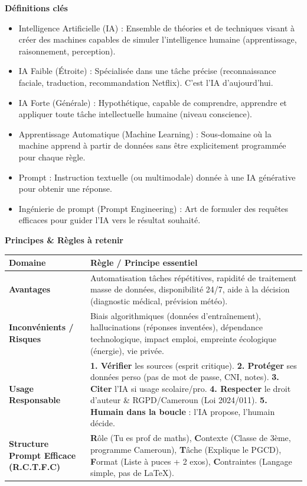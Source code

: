 \documentclass[11pt]{article}
\newcommand{\cle}[1]{{\popxbold\color{popdark}#1}}
\begin{document}
\begin{bilan}
\textbf{Définitions clés}
\begin{itemize}
  \item \cle{Intelligence Artificielle (IA)} : Ensemble de théories et de techniques visant à créer des machines capables de simuler l'intelligence humaine (apprentissage, raisonnement, perception).
  \item \cle{IA Faible (Étroite)} : Spécialisée dans une tâche précise (reconnaissance faciale, traduction, recommandation Netflix). C'est l'IA d'aujourd'hui.
  \item \cle{IA Forte (Générale)} : Hypothétique, capable de comprendre, apprendre et appliquer toute tâche intellectuelle humaine (niveau conscience).
  \item \cle{Apprentissage Automatique (Machine Learning)} : Sous-domaine où la machine apprend à partir de données sans être explicitement programmée pour chaque règle.
  \item \cle{Prompt} : Instruction textuelle (ou multimodale) donnée à une IA générative pour obtenir une réponse.
  \item \cle{Ingénierie de prompt (Prompt Engineering)} : Art de formuler des requêtes efficaces pour guider l'IA vers le résultat souhaité.
\end{itemize}

\textbf{Principes \& Règles à retenir}
\begin{center}
\begin{tabularx}{\linewidth}{|>{\bfseries}l|X|}
\hline
\rowcolor{popblueL}
\textcolor{popdark}{Domaine} & \textcolor{popdark}{Règle / Principe essentiel} \\
\hline
\textbf{Avantages} & Automatisation tâches répétitives, rapidité de traitement masse de données, disponibilité 24/7, aide à la décision (diagnostic médical, prévision météo). \\
\hline
\textbf{Inconvénients / Risques} & Biais algorithmiques (données d'entraînement), hallucinations (réponses inventées), dépendance technologique, impact emploi, empreinte écologique (énergie), vie privée. \\
\hline
\textbf{Usage Responsable} & \textbf{1. Vérifier} les sources (esprit critique). \textbf{2. Protéger} ses données perso (pas de mot de passe, CNI, notes). \textbf{3. Citer} l'IA si usage scolaire/pro. \textbf{4. Respecter} le droit d'auteur \& RGPD/Cameroun (Loi 2024/011). \textbf{5. Humain dans la boucle} : l'IA propose, l'humain décide. \\
\hline
\textbf{Structure Prompt Efficace (R.C.T.F.C)} & \textbf{R}ôle (Tu es prof de maths), \textbf{C}ontexte (Classe de 3ème, programme Cameroun), \textbf{T}âche (Explique le PGCD), \textbf{F}ormat (Liste à puces + 2 exos), \textbf{C}ontraintes (Langage simple, pas de LaTeX). \\
\hline
\end{tabularx}
\end{center}


\end{bilan}
\end{document}
